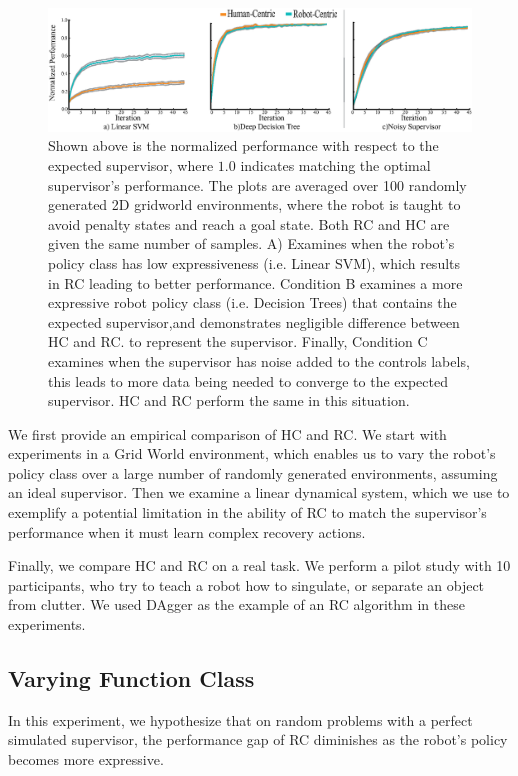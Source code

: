 \documentclass[10pt, conference]{ieeeconf}      %
\begin{document}
\begin{figure}
\includegraphics{f_figs/var_grid.eps}
\caption{
    \footnotesize
Shown above is the normalized performance with respect to the expected supervisor, where $1.0$ indicates matching the optimal supervisor's performance. The plots are averaged over 100 randomly generated 2D gridworld environments,  where the robot is taught to avoid penalty states and reach a goal state. Both RC and HC are given the same number of samples. A) Examines when the robot's policy class has low expressiveness (i.e. Linear SVM), which results in RC  leading to better performance. Condition B examines a more expressive robot policy class (i.e. Decision Trees) that contains the expected supervisor,and demonstrates negligible difference between HC and RC.  to represent the supervisor.  Finally, Condition C examines when the supervisor has noise added to the controls labels, this leads to more data being needed to converge to the expected supervisor. HC and RC perform the same in this situation.  }
\vspace*{-20pt}
\label{fig:var}
\end{figure}

We first provide an empirical comparison of HC and RC. 
We start with experiments in a  Grid World environment, which enables us to vary the robot's policy class over a large number of randomly generated environments, assuming an ideal supervisor. Then we examine a linear dynamical system, which we use to exemplify a potential limitation in the ability of RC to match the supervisor's performance when it must learn complex recovery actions.

Finally, we compare HC and RC on a real task. We perform a pilot study with 10 participants, who try to teach a robot how to singulate, or separate an object from clutter. We used DAgger as the example of an RC algorithm in these experiments. 

\subsection{Varying Function Class}\label{sec:gdw}
In this experiment, we hypothesize that on random problems with a perfect simulated supervisor, the performance gap of RC diminishes as the robot's policy becomes more expressive. 
\end{document}
